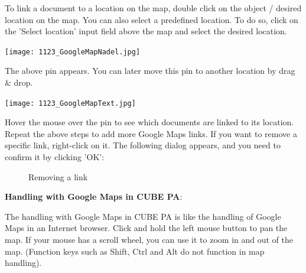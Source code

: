 To link a document to a location on the map, double click on the object / desired location on the map. You can also select a predefined location. To do so, click on the 'Select location' input field above the map and select the desired location.

\vspace{4mm}

\hspace{15mm} \texttt{[image: 1123\_GoogleMapNadel.jpg]}

The above pin appears. You can later move this pin to another location by drag \& drop. 

\hspace{15mm} \texttt{[image: 1123\_GoogleMapText.jpg]}

Hover the mouse over the pin to see which documents are linked to its location. \\

Repeat the above steps to add more Google Maps links. If you want to remove a specific link, right-click on it. The following dialog appears, and you need to confirm it by clicking 'OK':

\begin{figure}[H]
\caption{Removing a link}
\end{figure}

\vspace{\baselineskip}

\vspace{\baselineskip}

\textbf{Handling with Google Maps in CUBE PA}:

The handling with Google Maps in CUBE PA is like the handling of Google Maps in an Internet browser. Click and hold the left mouse button to pan the map. If your mouse has a scroll wheel, you can use it to zoom in and out of the map. (Function keys such as Shift, Ctrl and Alt do not function in map handling).

\vspace{\baselineskip}


